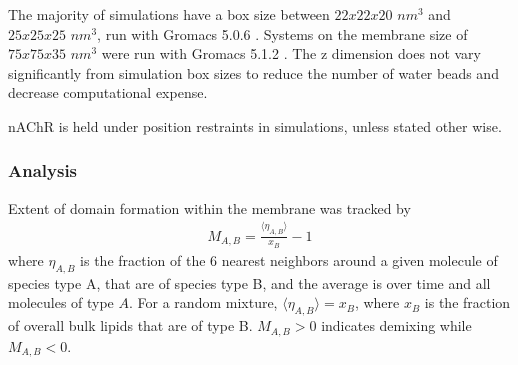The majority of simulations have a box size between $22x22x20$ $nm^3$ and $25x25x25$ $nm^3$, run with Gromacs 5.0.6 \cite{grom}. Systems on the membrane size of $75x75x35$ $nm^3$ were run with Gromacs 5.1.2 \cite{grom}. The z dimension does not vary significantly from simulation box sizes to reduce the number of water beads and decrease computational expense. 

nAChR is held under position restraints in simulations, unless stated other wise.

\subsubsection{Analysis}

\newcommand{\bsat}{b_{\mathrm{sat}}}
\newcommand{\qsat}{Q_{\mathrm{sat}}}
\newcommand{\xsat}{x_{\mathrm{sat}}}
\newcommand{\nbound}{b_{\mathrm{tot}}}
\newcommand{\lo}{l_{\mathrm{o}}}
\newcommand{\ldo}{l_{\mathrm{do}}}

Extent of domain formation within the membrane was tracked by 
    \begin{equation}
    \begin{aligned}
      M_{A, B} = \frac{\langle \eta_{A,B} \rangle} {x_{B}} - 1
    \end{aligned}
    \label{eq:M}
  \end{equation}
 where $\eta_{A,B}$ is the fraction of the 6 nearest neighbors around a given molecule of species type A, that are of species type B, and the average is over time and all molecules of type $A$. For a random mixture, $\langle \eta_{A,B} \rangle = x_{B}$, where $x_{B}$ is the fraction of overall bulk lipids that are of type B. $M_{A,B}>0$ indicates demixing while $M_{A,B}<0$.  


